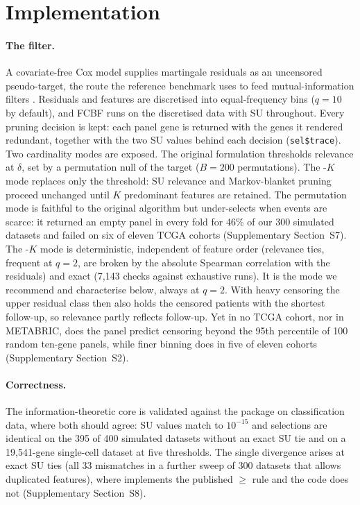 \section{Implementation}

\paragraph{The filter.} A covariate-free Cox model \citep{therneau2000} supplies
martingale residuals as an uncensored pseudo-target, the route the reference
benchmark uses to feed mutual-information filters \citep{bommert2021bib}.
Residuals and features are discretised into equal-frequency bins ($q = 10$ by
default), and FCBF runs on the discretised data with SU throughout. Every pruning
decision is kept: each panel gene is returned with the genes it rendered redundant,
together with the two SU values behind each decision (\verb|sel$trace|). Two
cardinality modes are exposed. The original
formulation thresholds relevance at $\delta$, set by a permutation null of the
target ($B = 200$ permutations). The -$K$ mode replaces only the
threshold: SU relevance and Markov-blanket pruning proceed unchanged until $K$
predominant features are retained. The permutation mode is faithful to the
original algorithm but under-selects when events are scarce: it returned an
empty panel in every fold for 46\% of our 300 simulated datasets and failed on
six of eleven TCGA cohorts (Supplementary Section~S7). The -$K$ mode is
deterministic, independent of feature order (relevance ties, frequent at $q = 2$, are
broken by the absolute Spearman correlation with the residuals) and exact (7{,}143
checks against exhaustive runs). It is the mode we recommend and characterise below,
always at $q = 2$. With heavy censoring the upper residual class then also holds the
censored patients with the shortest follow-up, so relevance partly reflects
follow-up. Yet in no TCGA cohort, nor in METABRIC, does the panel predict censoring
beyond the 95th percentile of 100 random ten-gene panels, while finer binning does in
five of eleven cohorts (Supplementary Section~S2).

\paragraph{Correctness.} The information-theoretic core is validated against the
 package \citep{fcbfbioc} on classification data, where
both should agree: SU values match to $10^{-15}$ and selections are identical on
the 395 of 400 simulated datasets without an exact SU tie and on a 19{,}541-gene
single-cell dataset at five thresholds. The single divergence arises at exact SU
ties (all 33 mismatches in a further sweep of 300 datasets that allows duplicated
features), where  implements the published $\ge$ rule \citep{yu2003}
and the  code does not (Supplementary Section~S8).

